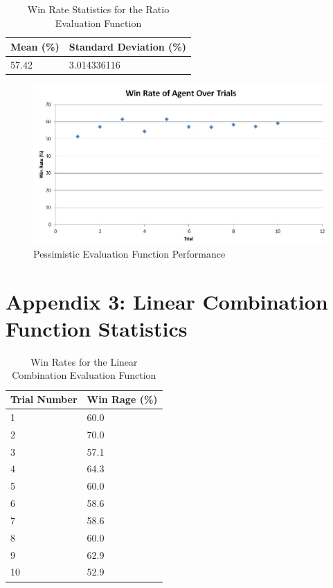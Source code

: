 \documentclass[12pt]{article}
\begin{document}
\begin{table}[h]
\centering
\caption{Win Rate Statistics for the Ratio Evaluation Function}
\label{ratio-stats}
\begin{tabular}{@{}|l|l|@{}}
\toprule
Mean (\%)& Standard Deviation (\%) \\ \midrule
57.42           & 3.014336116
\\ \bottomrule
\end{tabular}
\end{table}

\begin{figure}[htbp]
\centering
\caption{Pessimistic Evaluation Function Performance}
\includegraphics[scale=0.71]{pessimistic-evaluation-function-results.JPG}
\end{figure}

\clearpage
\section{Appendix 3: Linear Combination Function Statistics}
\begin{table}[h]
\centering
\caption{Win Rates for the Linear Combination Evaluation Function}
\label{pessimistic-label}
\begin{tabular}{@{}|l|l|@{}}
\toprule
Trial Number & Win Rage (\%) \\ \midrule
1            & 60.0          \\ \midrule
2            & 70.0          \\ \midrule
3            & 57.1          \\ \midrule
4            & 64.3          \\ \midrule
5            & 60.0          \\ \midrule
6            & 58.6          \\ \midrule
7            & 58.6          \\ \midrule
8            & 60.0          \\ \midrule
9            & 62.9          \\ \midrule
10           & 52.9          \\ \bottomrule
\end{tabular}
\end{table}
\end{document}
